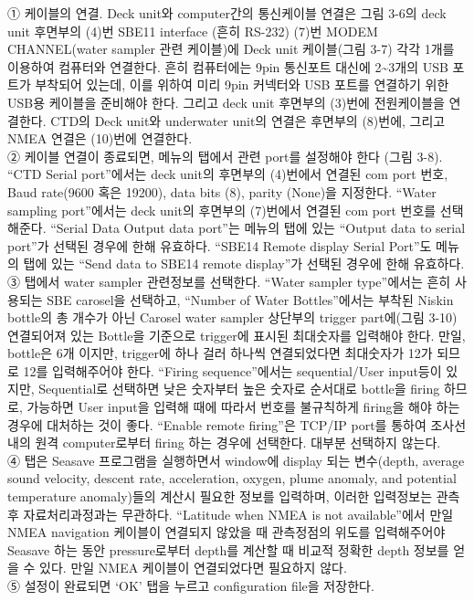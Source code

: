 \documentclass[
]{book}
\begin{document}
① 케이블의 연결. Deck unit와 computer간의 통신케이블 연결은 그림 3-6의 deck unit 후면부의 (4)번 SBE11 interface (흔히 RS-232) (7)번 MODEM CHANNEL(water sampler 관련 케이블)에 Deck unit 케이블(그림 3-7) 각각 1개를 이용하여 컴퓨터와 연결한다. 흔히 컴퓨터에는 9pin 통신포트 대신에 2\textasciitilde3개의 USB 포트가 부착되어 있는데, 이를 위하여 미리 9pin 커넥터와 USB 포트를 연결하기 위한 USB용 케이블을 준비해야 한다. 그리고 deck unit 후면부의 (3)번에 전원케이블을 연결한다. CTD의 Deck unit와 underwater unit의 연결은 후면부의 (8)번에, 그리고 NMEA 연결은 (10)번에 연결한다.\\
② 케이블 연결이 종료되면, 메뉴의 탭에서 관련 port를 설정해야 한다 (그림 3-8). ``CTD Serial port''에서는 deck unit의 후면부의 (4)번에서 연결된 com port 번호, Baud rate(9600 혹은 19200), data bits (8), parity (None)을 지정한다. ``Water sampling port''에서는 deck unit의 후면부의 (7)번에서 연결된 com port 번호를 선택해준다. ``Serial Data Output data port''는 메뉴의 탭에 있는 ``Output data to serial port''가 선택된 경우에 한해 유효하다. ``SBE14 Remote display Serial Port''도 메뉴의 탭에 있는 ``Send data to SBE14 remote display''가 선택된 경우에 한해 유효하다.\\
③ 탭에서 water sampler 관련정보를 선택한다. ``Water sampler type''에서는 흔히 사용되는 SBE carosel을 선택하고, ``Number of Water Bottles''에서는 부착된 Niskin bottle의 총 개수가 아닌 Carosel water sampler 상단부의 trigger part에(그림 3-10) 연결되어져 있는 Bottle을 기준으로 trigger에 표시된 최대숫자를 입력해야 한다. 만일, bottle은 6개 이지만, trigger에 하나 걸러 하나씩 연결되었다면 최대숫자가 12가 되므로 12를 입력해주어야 한다. ``Firing sequence''에서는 sequential/User input등이 있지만, Sequential로 선택하면 낮은 숫자부터 높은 숫자로 순서대로 bottle을 firing 하므로, 가능하면 User input을 입력해 때에 따라서 번호를 불규칙하게 firing을 해야 하는 경우에 대처하는 것이 좋다. ``Enable remote firing''은 TCP/IP port를 통하여 조사선내의 원격 computer로부터 firing 하는 경우에 선택한다. 대부분 선택하지 않는다.\\
④ 탭은 Seasave 프로그램을 실행하면서 window에 display 되는 변수(depth, average sound velocity, descent rate, acceleration, oxygen, plume anomaly, and potential temperature anomaly)들의 계산시 필요한 정보를 입력하며, 이러한 입력정보는 관측후 자료처리과정과는 무관하다. ``Latitude when NMEA is not available''에서 만일 NMEA navigation 케이블이 연결되지 않았을 때 관측정점의 위도를 입력해주어야 Seasave 하는 동안 pressure로부터 depth를 계산할 때 비교적 정확한 depth 정보를 얻을 수 있다. 만일 NMEA 케이블이 연결되었다면 필요하지 않다.\\
⑤ 설정이 완료되면 `OK' 탭을 누르고 configuration file을 저장한다.
\end{document}
